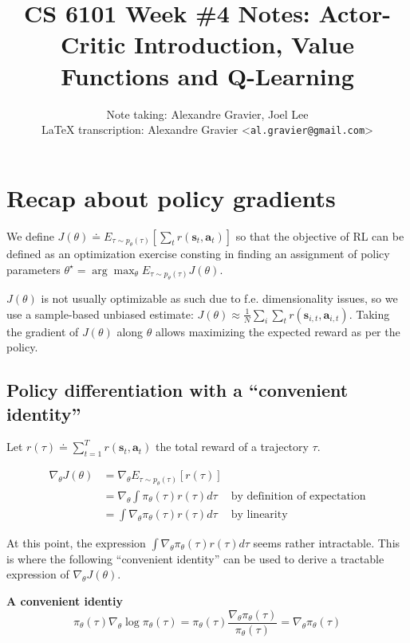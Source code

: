 \documentclass{article}
\title{CS 6101 Week \#4 Notes: Actor-Critic Introduction, Value Functions and Q-Learning}
\author{
  Note taking: Alexandre Gravier, Joel Lee\\
  \LaTeX{} transcription: Alexandre Gravier <\texttt{al.gravier@gmail.com}> \\
}
\begin{document}
\maketitle



\section{Recap about policy gradients}


We define $J(\theta) \doteq E_{\tau\sim p_\theta(\tau)}\left[\sum_t r\left(\mathbf{s}_t,\mathbf{a}_t\right)\right]$ so that the objective of RL can be defined as an optimization exercise consting in finding an assignment of policy parameters $\theta^\star = \arg\max_\theta E_{\tau\sim p_\theta(\tau)}J(\theta)$.

$J(\theta)$ is not usually optimizable as such due to f.e. dimensionality issues, so we
use a sample-based unbiased estimate: $J(\theta) \approx \frac{1}{N} \sum_i \sum_t r\left(\mathbf{s}_{i,t},\mathbf{a}_{i,t}\right)$. Taking the gradient of $J(\theta)$ along $\theta$ allows maximizing the expected reward as per the policy.

\subsection{Policy differentiation with a ``convenient identity''}

Let $r(\tau) \doteq \sum_{t=1}^T r\left(\mathbf{s}_t,\mathbf{a}_t\right)$ the total reward of a trajectory $\tau$.

\begin{subequations}
  \begin{align}
    \nabla_\theta J(\theta) 
      &= \nabla_\theta E_{\tau\sim p_\theta(\tau)}[r(\tau)] & \\
      &= \nabla_\theta\int\pi_\theta(\tau) r(\tau)d\tau &\text{by definition of expectation}\\ 
      &= \int\nabla_\theta\pi_\theta(\tau) r(\tau)d\tau &\text{by linearity} \label{eq:gradjintegral}
  \end{align}
\end{subequations}

At this point, the expression $\int\nabla_\theta\pi_\theta(\tau) r(\tau)d\tau$ seems rather intractable. This is where the following ``convenient identity'' can be used to derive a tractable expression of $\nabla_\theta J(\theta)$.

\begin{shaded}
  \textbf{A convenient identiy}
  \begin{equation} \label{eq:convenientidentity}
    \pi_\theta (\tau)\nabla_\theta \log \pi_\theta (\tau) = \pi_\theta (\tau) \frac{\nabla_\theta \pi_\theta (\tau)}{\pi_\theta (\tau)} = \nabla_\theta \pi_\theta (\tau)
  \end{equation}
\end{shaded}
\end{document}
